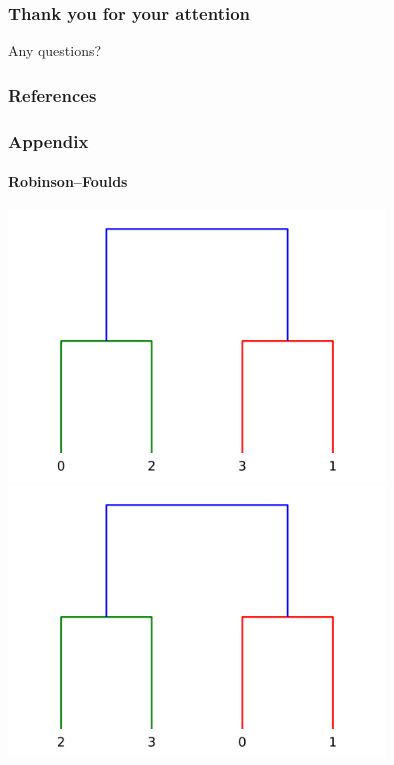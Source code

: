 \documentclass{tum-presentation}
\begin{document}
\begin{frame}
	\frametitle{Thank you for your attention}
\begin{center}
		\huge Any questions?
\end{center}
\end{frame}


\begin{frame}[allowframebreaks]
	\frametitle{References}
	\printbibliography
\end{frame}



\begin{frame}
	\frametitle{Appendix}
	\framesubtitle{Robinson–Foulds \cite{ROBINSON}}
	
	\includegraphics[width = 10cm]{../figures/rf_example_1-1.png}\hspace{.5cm}\vline\hspace{.5cm}
	\includegraphics[width = 10cm]{../figures/rf_example_2.png}
	

\end{frame}
\end{document}
